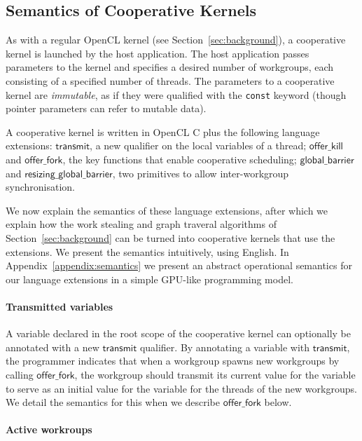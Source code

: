 \documentclass[nocopyrightspace]{sigplanconf-pldi16}
\newcommand{\transmit}{\mathsf{transmit}}
\newcommand{\offerfork}{\mathsf{offer\_fork}}
\newcommand{\offerkill}{\mathsf{offer\_kill}}
\newcommand{\globalbarrier}{\mathsf{global\_barrier}}
\newcommand{\resizingglobalbarrier}{\mathsf{resizing\_global\_barrier}}
\begin{document}
\subsection{Semantics of Cooperative Kernels}\label{sec:semantics}

As with a regular OpenCL kernel (see Section~\ref{sec:background}), a
cooperative kernel is launched by the host application.  The host
application passes parameters to the kernel and specifies a desired
number of workgroups, each consisting of a specified number of
threads.  The parameters to a cooperative kernel are \emph{immutable}, as if
they were qualified with the \texttt{const} keyword (though pointer
parameters can refer to mutable data).

A cooperative kernel is written in OpenCL C plus the following
language extensions: $\transmit$, a
new qualifier on the local variables of a thread; $\offerkill$ and
$\offerfork$, the key functions that enable cooperative scheduling;
$\globalbarrier$ and $\resizingglobalbarrier$, two primitives to allow
inter-workgroup synchronisation.

We now explain the semantics of these language extensions, after which
we explain how the work stealing and graph traveral algorithms of
Section~\ref{sec:background} can be turned into cooperative kernels
that use the extensions.  We present the semantics intuitively, using English.
In Appendix~\ref{appendix:semantics} we present an abstract operational semantics for our language extensions in a simple GPU-like programming model.

\paragraph{Transmitted variables}

A variable declared in the root scope of the cooperative kernel can
optionally be annotated with a new $\transmit$ qualifier.  By
annotating a variable with $\transmit$, the programmer indicates that
when a workgroup spawns new workgroups by calling $\offerfork$, the
workgroup should transmit its current value for the variable to serve
as an initial value for the variable for the threads of the new workgroups.  We detail the semantics
for this when we describe $\offerfork$ below.

\paragraph{Active workroups}
\end{document}
